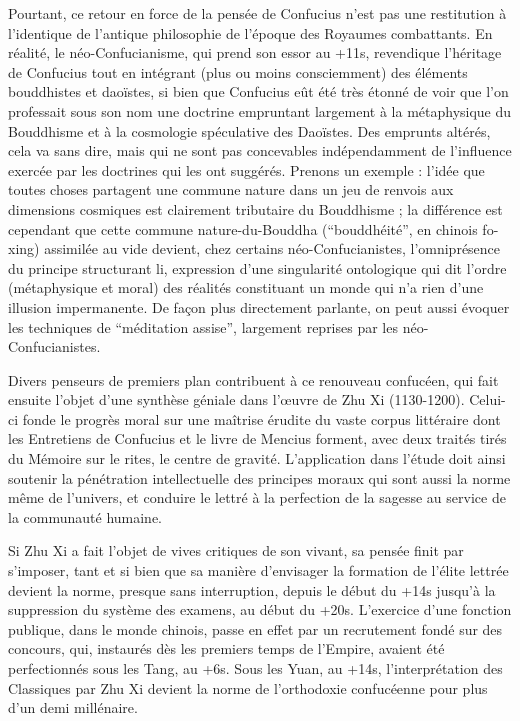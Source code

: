 Pourtant, ce retour en force de la pensée de Confucius n'est pas une restitution à
l'identique de l'antique philosophie de l'époque des Royaumes combattants.
En réalité,
le néo-Confucianisme, qui prend son essor au +11s, revendique l'héritage de
Confucius tout en intégrant (plus ou moins consciemment) des éléments bouddhistes et
daoïstes, si bien que Confucius eût été très étonné de voir que l'on professait sous son
nom une doctrine empruntant largement à la métaphysique du Bouddhisme et à la cosmologie spéculative des Daoïstes.
Des emprunts altérés, cela va sans dire, mais qui ne
sont pas concevables indépendamment de l'influence exercée par les doctrines qui les
ont suggérés.
Prenons un exemple : l'idée que toutes choses partagent une commune
nature dans un jeu de renvois aux dimensions cosmiques est clairement tributaire du
Bouddhisme ; la différence est cependant que cette commune nature-du-Bouddha
(``bouddhéité'', en chinois fo-xing) assimilée au vide devient, chez certains néo-Confucianistes, l'omniprésence du principe structurant li, expression d'une singularité
ontologique qui dit l'ordre (métaphysique et moral) des réalités constituant un monde
qui n'a rien d'une illusion impermanente.
De façon plus directement parlante, on peut
aussi évoquer les techniques de ``méditation assise'', largement reprises par les néo-Confucianistes.

Divers penseurs de premiers plan contribuent à ce renouveau confucéen, qui fait ensuite
l'objet d'une synthèse géniale dans l'œuvre de Zhu Xi (1130-1200).
Celui-ci fonde le
progrès moral sur une maîtrise érudite du vaste corpus littéraire dont les Entretiens de
Confucius et le livre de Mencius forment, avec deux traités tirés du Mémoire sur le rites,
le centre de gravité.
L'application dans l'étude doit ainsi soutenir la pénétration intellectuelle des principes moraux qui sont aussi la norme même de l'univers, et conduire le
lettré à la perfection de la sagesse au service de la communauté humaine.

Si Zhu Xi a fait l'objet de vives critiques de son vivant, sa pensée finit par s'imposer,
tant et si bien que sa manière d'envisager la formation de l'élite lettrée devient la norme,
presque sans interruption, depuis le début du +14s jusqu'à la suppression du système des examens, au début du +20s.
L'exercice d'une fonction publique, dans le
monde chinois, passe en effet par un recrutement fondé sur des concours, qui, instaurés
dès les premiers temps de l'Empire, avaient été perfectionnés sous les Tang, au +6s.
Sous les Yuan, au +14s, l'interprétation des Classiques par Zhu Xi devient la
norme de l'orthodoxie confucéenne pour plus d'un demi millénaire.

